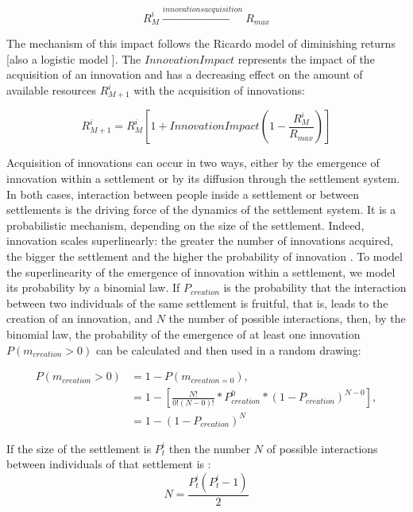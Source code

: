 \begin{equation}
R^{i}_{M} \xrightarrow{innovations acquisition} R_{max}
\end{equation}

The mechanism of this impact follows the Ricardo model of diminishing returns [also a logistic model \autocite{Turchin2003}]. The $InnovationImpact$ represents the impact of the acquisition of an innovation and has a decreasing effect on the amount of available resources $R^{i}_{M+1}$ with the acquisition of innovations:

\begin{equation}
R^{i}_{M+1} = R^{i}_{M} \left[ 1 + InnovationImpact \left( 1 - \frac{R^{i}_{M}}{R_{max}}\right)\right]
\end{equation}

Acquisition of innovations can occur in two ways, either by the emergence of innovation within a settlement or by its diffusion through the settlement system. In both cases, interaction between people inside a settlement or between settlements is the driving force of the dynamics of the settlement system. It is a probabilistic mechanism, depending on the size of the settlement. Indeed, innovation scales superlinearly: the greater the number of innovations acquired, the bigger the settlement and the higher the probability of innovation \autocites{Arthur2009, Diamond1997, Lane2009}. To model the superlinearity of the emergence of innovation within a settlement, we model its probability by a binomial law. If $P_{creation}$ is the probability that the interaction between two individuals of the same settlement is fruitful, that is, leads to the creation of an innovation, and $N$ the number of possible interactions, then, by the binomial law, the probability of the emergence of at least one innovation $P(m_{creation} > 0)$ can be calculated and then used in a random drawing:

\begin{equation}
\begin{split}
P(m_{creation} > 0) & =  1 - P\left(m_{creation = 0}\right),  \\
& = 1 - \left[   \frac{N!}{0!(N - 0)!} * P^{0}_{creation} * (1 - P_{creation})^{N - 0}  \right], \\
& = 1 - \left( 1 - P_{creation} \right)^{N}
\end{split}
\end{equation}

If the size of the settlement is $P^{i}_{t}$ then the number $N$ of possible interactions between individuals of that settlement is :
 \begin{equation}
N = \frac{P^{i}_{t} \left(P^{i}_{t}  - 1 \right)}{2}
\end{equation}

